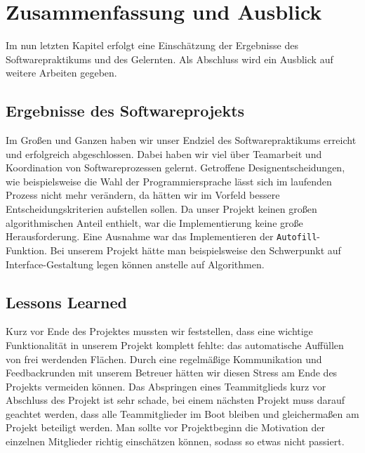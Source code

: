 \section{Zusammenfassung und Ausblick}
\label{sec:zusammenfassung}
Im nun letzten Kapitel erfolgt eine Einschätzung der Ergebnisse des Softwarepraktikums und des Gelernten. Als Abschluss wird ein Ausblick auf weitere Arbeiten gegeben.

\subsection{Ergebnisse des Softwareprojekts}
\label{subsec:ergebnisse}

Im Großen und Ganzen haben wir unser Endziel des Softwarepraktikums erreicht und erfolgreich abgeschlossen. Dabei haben wir viel über Teamarbeit und Koordination von Softwareprozessen gelernt. Getroffene Designentscheidungen, wie beispielsweise die Wahl der Programmiersprache lässt sich im laufenden Prozess nicht mehr verändern, da hätten wir im Vorfeld bessere Entscheidungskriterien aufstellen sollen. Da unser Projekt keinen großen algorithmischen Anteil enthielt, war die Implementierung keine große Herausforderung. Eine Ausnahme war das Implementieren der \texttt{Autofill}-Funktion. Bei unserem Projekt hätte man beispielsweise den Schwerpunkt auf Interface-Gestaltung legen können anstelle auf Algorithmen.

\subsection{Lessons Learned}
\label{subsec:lessons}

Kurz vor Ende des Projektes mussten wir feststellen, dass eine wichtige Funktionalität in unserem Projekt komplett fehlte: das automatische Auffüllen von frei werdenden Flächen. Durch eine regelmäßige Kommunikation und Feedbackrunden mit unserem Betreuer hätten wir diesen Stress am Ende des Projekts vermeiden können. 
Das Abspringen eines Teammitglieds kurz vor Abschluss des Projekt ist sehr schade, bei einem nächsten Projekt muss darauf geachtet werden, dass alle Teammitglieder im Boot bleiben und gleichermaßen am Projekt beteiligt werden. Man sollte vor Projektbeginn die Motivation der einzelnen Mitglieder richtig einschätzen können, sodass so etwas nicht passiert.

